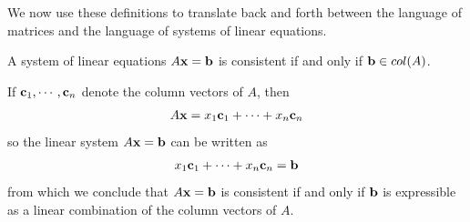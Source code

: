 \documentclass[12pt,letterpaper,reqno]{article}
\numberwithin{equation}{section}
\begin{document}
We now use these definitions to translate back and forth between the language of matrices and the language of systems of linear equations.

\begin{thm}
A system of linear equations $A{\bf x}={\bf b}$ is consistent if and only if ${\bf b} \in col(A)$.	
\end{thm}

\begin{pf}
If ${\bf c}_1, \cdots, {\bf c}_n$ denote the column vectors of $A$, then
\begin{align*}
	A{\bf x}=x_1{\bf c}_1+\cdots + x_n {\bf c}_n
\end{align*}
so the linear system $A{\bf x}={\bf b}$ can be written as 
\begin{align*}
	x_1{\bf c}_1+\cdots + x_n {\bf c}_n={\bf b}
\end{align*}
from which we conclude that $A{\bf x}={\bf b}$ is consistent if and only if ${\bf b}$ is expressible as a linear combination of the column vectors of $A$.	
\end{pf}
\end{document}
